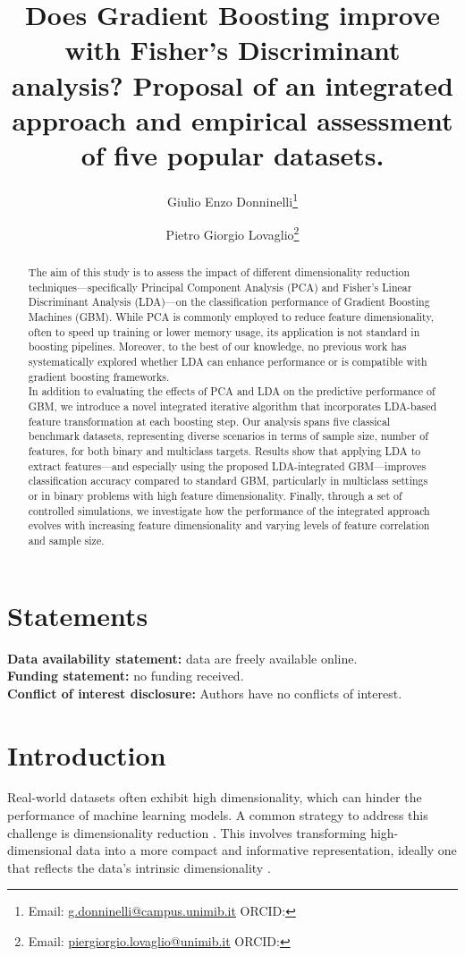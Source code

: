 \documentclass[11pt,a4paper]{article}
\title{Does Gradient Boosting improve with Fisher’s Discriminant analysis? Proposal of an integrated approach and empirical assessment of five popular datasets.}
\author[1]{Giulio Enzo Donninelli\thanks{Email: \href{mailto:g.donninelli@campus.unimib.it}{g.donninelli@campus.unimib.it} \quad ORCID: \orcidlink{0009-0009-7332-1159}}}
\author[1,2]{Pietro Giorgio Lovaglio\thanks{Email: \href{mailto:piergiorgio.lovaglio@unimib.it}{piergiorgio.lovaglio@unimib.it} \quad ORCID: \orcidlink{0000-0002-2340-0547}}}
\affil[1]{Dept of Statistics and Quantitative Methods, University of Milano-Bicocca, Milan, Italy}
\affil[2]{CRISP Research Center, University of Milano-Bicocca, Milan, Italy}
\date{} %
\begin{document}
\maketitle

\begin{abstract}
The aim of this study is to assess the impact of different dimensionality reduction techniques—specifically Principal Component Analysis (PCA) and Fisher's Linear Discriminant Analysis (LDA)—on the classification performance of Gradient Boosting Machines (GBM). While PCA is commonly employed to reduce feature dimensionality, often to speed up training or lower memory usage, its application is not standard in boosting pipelines. Moreover, to the best of our knowledge, no previous work has systematically explored whether LDA can enhance performance or is compatible with gradient boosting frameworks.\\[2ex]

In addition to evaluating the effects of PCA and LDA on the predictive performance of GBM, we introduce a novel integrated iterative algorithm that incorporates LDA-based feature transformation at each boosting step. Our analysis spans five classical benchmark datasets, representing diverse scenarios in terms of sample size, number of features, for both binary and multiclass targets. Results show that applying LDA to extract features—and especially using the proposed LDA-integrated GBM—improves classification accuracy compared to standard GBM, particularly in multiclass settings or in binary problems with high feature dimensionality. Finally, through a set of controlled simulations, we investigate how the performance of the integrated approach evolves with increasing feature dimensionality and varying levels of feature correlation and sample size.

\end{abstract}

\section*{Statements}
\noindent\textbf{Data availability statement:} data are freely available online.\\
\textbf{Funding statement:} no funding received.\\
\textbf{Conflict of interest disclosure:} Authors have no conflicts of interest.

\newpage
\section{Introduction}
Real-world datasets often exhibit high dimensionality, which can hinder the performance of machine learning models. A common strategy to address this challenge is dimensionality reduction \citep{van2009dimensionality}. This involves transforming high-dimensional data into a more compact and informative representation, ideally one that reflects the data's intrinsic dimensionality \citep{huang2019review, bacanin2021dimensionality}.
\end{document}
